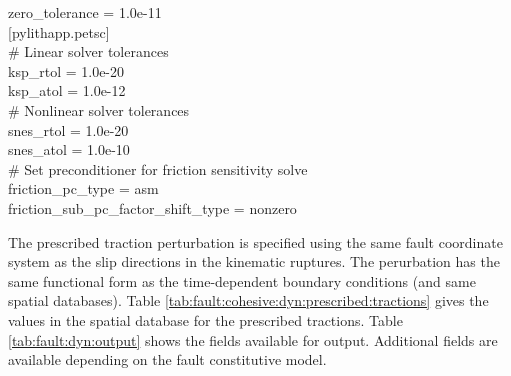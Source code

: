 \begin{lyxcode}

zero\_tolerance = 1.0e-11 \\

[pylithapp.petsc] \\
\# Linear solver tolerances \\
ksp\_rtol = 1.0e-20 \\
ksp\_atol = 1.0e-12 \\

\# Nonlinear solver tolerances \\
snes\_rtol = 1.0e-20 \\
snes\_atol = 1.0e-10 \\

\# Set preconditioner for friction sensitivity solve \\
friction\_pc\_type = asm \\
friction\_sub\_pc\_factor\_shift\_type = nonzero
\end{lyxcode}
The prescribed traction perturbation is specified using the same fault
coordinate system as the slip directions in the kinematic ruptures.
The perurbation has the same functional form as the time-dependent
boundary conditions (and same spatial databases). Table \vref{tab:fault:cohesive:dyn:prescribed:tractions}
gives the values in the spatial database for the prescribed tractions.
Table \vref{tab:fault:dyn:output} shows the fields available for output.
Additional fields are available depending on the fault constitutive
model.

